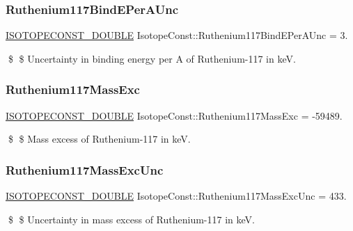 \subsubsection{\texorpdfstring{Ruthenium117\+Bind\+E\+Per\+A\+Unc}{Ruthenium117BindEPerAUnc}}
{\footnotesize\ttfamily \mbox{\hyperlink{group___isotope_const-_macros_ga8f45a7272ce02c0b4c65c44636ed719a}{I\+S\+O\+T\+O\+P\+E\+C\+O\+N\+S\+T\+\_\+\+D\+O\+U\+B\+LE}} Isotope\+Const\+::\+Ruthenium117\+Bind\+E\+Per\+A\+Unc = 3.}

\$ \$ Uncertainty in binding energy per A of Ruthenium-\/117 in keV. \mbox{\label{group___isotope_const-_ruthenium-_ru117_gafac9938f11ea48480dd258442f74b254}} 
\subsubsection{\texorpdfstring{Ruthenium117\+Mass\+Exc}{Ruthenium117MassExc}}
{\footnotesize\ttfamily \mbox{\hyperlink{group___isotope_const-_macros_ga8f45a7272ce02c0b4c65c44636ed719a}{I\+S\+O\+T\+O\+P\+E\+C\+O\+N\+S\+T\+\_\+\+D\+O\+U\+B\+LE}} Isotope\+Const\+::\+Ruthenium117\+Mass\+Exc = -\/59489.}

\$ \$ Mass excess of Ruthenium-\/117 in keV. \mbox{\label{group___isotope_const-_ruthenium-_ru117_ga8b456cc38d8c15a4cd19f65eb664d997}} 
\subsubsection{\texorpdfstring{Ruthenium117\+Mass\+Exc\+Unc}{Ruthenium117MassExcUnc}}
{\footnotesize\ttfamily \mbox{\hyperlink{group___isotope_const-_macros_ga8f45a7272ce02c0b4c65c44636ed719a}{I\+S\+O\+T\+O\+P\+E\+C\+O\+N\+S\+T\+\_\+\+D\+O\+U\+B\+LE}} Isotope\+Const\+::\+Ruthenium117\+Mass\+Exc\+Unc = 433.}

\$ \$ Uncertainty in mass excess of Ruthenium-\/117 in keV. \mbox{\label{group___isotope_const-_ruthenium-_ru117_ga5f096b1c8adeeeb4fb114186076a2be2}} 
